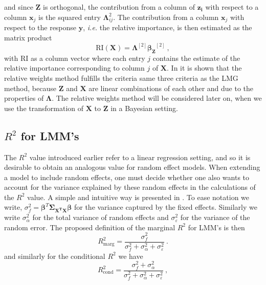 and since $\mathbf{Z}$ is orthogonal, the contribution from a column of $\mathbf{z_i}$ with respect to a column $\mathbf{x}_j$ is the squared entry $\boldsymbol{\Lambda}_{ij}^2$.
The contribution from a column $\mathbf{x}_j$ with respect to the response $\mathbf{y}$, \textit{i.e.} the relative importance, is then estimated as the matrix product \citep{johnson_relative_weights}
\begin{equation}
    \label{eq:RI_lambda}
    \text{RI}(\mathbf{X}) = \boldsymbol{\Lambda}^{[2]} \boldsymbol{\beta_Z}^{[2]} \ , 
\end{equation}
with $\text{RI}$ as a column vector where each entry $j$ contains the estimate of the relative importance corresponding to column $j$ of $\mathbf{X}$.
In \citet[section 2.5.3]{matre} it is shown that the relative weights method fulfills the criteria same three criteria as the LMG method, because $\mathbf{Z}$ and $\mathbf{X}$ are linear combinations of each other and due to the properties of $\boldsymbol{\Lambda}$.
The relative weights method will be considered later on, when we use the transformation of $\mathbf{X}$ to $\mathbf{Z}$ in a Bayesian setting.


\subsection{$R^2$ for LMM's}
\label{sec:R2_LMM}
The $R^2$ value introduced earlier refer to a linear regression setting, and so it is desirable to obtain an analogous value for random effect models.
When extending a model to include random effects, one must decide whether one also wants to account for the variance explained by these random effects in the calculations of the $R^2$ value.
A simple and intuitive way is presented in \citet{nakagawa2013general}. To ease notation we write, $\sigma^2_f = \boldsymbol{\beta}^T \boldsymbol{\Sigma_{\mathbf{X^TX}}}\boldsymbol{\beta}$ for the variance captured by the fixed effects. Similarly we write $\sigma_{\alpha}^2$ for the total variance of random effects and $\sigma^2_{\varepsilon}$ for the variance of the random error. 
The proposed definition of the marginal $R^2$ for LMM's is then
\begin{equation}
    R^2_{\text{marg}} = \frac{\sigma^2_f}{\sigma^2_f + \sigma^2_{\alpha} + \sigma^2_{\varepsilon}} \ .
    \label{eq:R2_LMM_marginal}
\end{equation}
and similarly for the conditional $R^2$ we have
\begin{equation}
    R^2_{\text{cond}} = \frac{\sigma^2_f + \sigma^2_{\alpha}}{\sigma^2_f + \sigma^2_{\alpha} + \sigma^2_{\varepsilon}} \ ,
    \label{eq:R2_LMM_conditional}
\end{equation}

